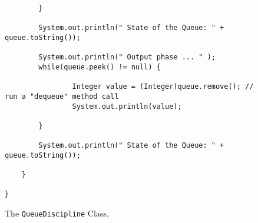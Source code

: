 \documentclass[12pt]{article}
\begin{document}
\begin{enumerate}
\begin{figure}[t]
{\begin{verbatim}
        }

        System.out.println(" State of the Queue: " + queue.toString());

        System.out.println(" Output phase ... " );
        while(queue.peek() != null) {

                Integer value = (Integer)queue.remove(); // run a "dequeue" method call
                System.out.println(value);

        }

        System.out.println(" State of the Queue: " + queue.toString());

    }

}
\end{verbatim}
}

\caption{The {\tt QueueDiscipline} Class.}
\label{Queue}
\end{figure}







\end{enumerate}
\end{document}
